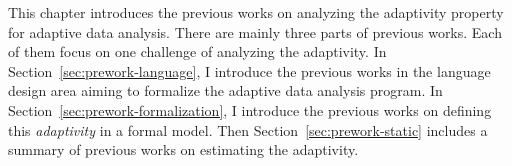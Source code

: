 This chapter introduces the previous works on analyzing the adaptivity property
for adaptive data analysis.
There are mainly three parts of previous works.
Each of them focus on one challenge of analyzing the adaptivity.
In Section~\ref{sec:prework-language}, I introduce the previous works in the language design area aiming to formalize
the adaptive data analysis program.
In Section~\ref{sec:prework-formalization}, I introduce the previous works
on defining this \emph{adaptivity} in a formal model.
Then Section~\ref{sec:prework-static} includes a summary of previous works on estimating
the adaptivity.
